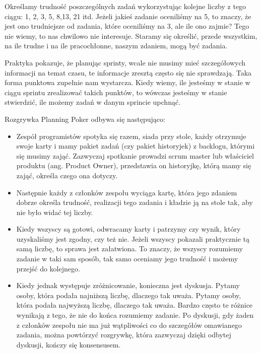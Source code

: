 Określamy trudność poszczególnych zadań wykorzystując kolejne liczby z tego ciągu: 1, 2, 3, 5, 8,13, 21 itd.
Jeżeli jakieś zadanie oceniliśmy na 5, to znaczy, że jest ono trudniejsze od zadania, które oceniliśmy na 3,
ale ile ono zajmie? Tego nie wiemy, to nas chwilowo nie interesuje.
Staramy się określić, przede wszystkim, na ile trudne i na ile pracochłonne, naszym zdaniem, mogą być zadania.

Praktyka pokazuje, że planując sprinty, wcale nie musimy mieć szczegółowych informacji na temat czasu,
te informacje zresztą często się nie sprawdzają.
Taka forma punktowa zupełnie nam wystarcza. Kiedy wiemy, ile jesteśmy w stanie w ciągu sprintu
zrealizować takich punktów, to wówczas jesteśmy w stanie stwierdzić, ile możemy zadań w danym sprincie upchnąć.

Rozgrywka Planning Poker odbywa się następująco:

\begin{itemize}
	\item Zespół programistów spotyka się razem, siada przy stole,
	każdy otrzymuje swoje karty i mamy pakiet zadań (czy pakiet historyjek) z backlogu,
	którymi się musimy zająć.
	Zazwyczaj spotkanie prowadzi scrum master lub właściciel produktu (ang. Product Owner),
	przedstawia on historyjkę, którą mamy się zająć, określa czego ona dotyczy.
	\item Następnie każdy z członków zespołu wyciąga kartę, która jego zdaniem dobrze określa trudność,
	realizacji tego zadania i kładzie ją na stole tak, aby nie było widać tej liczby.
	\item Kiedy wszyscy są gotowi, odwracamy karty i patrzymy czy wynik, który uzyskaliśmy jest zgodny,
	czy też nie. Jeżeli wszyscy pokazali praktycznie tą samą liczbę, to sprawa jest załatwiona.
	To znaczy, że wszyscy rozumiemy zadanie w taki sam sposób, tak samo oceniamy jego trudność
	i możemy przejść do kolejnego.
	\item Kiedy jednak występuje zróżnicowanie, konieczna jest dyskusja.
	Pytamy osoby, która podała najniższą liczbę, dlaczego tak uważa.
	Pytamy osoby, która podała najwyższą liczbę, dlaczego tak uważa.
	Bardzo często te różnice wynikają z tego, że nie do końca rozumiemy zadanie.
	Po dyskusji, gdy żaden z członków zespołu nie ma już wątpliwości co do
	szczegółów omawianego zadania, można powtórzyć rozgrywkę, która zazwyczaj dzięki
	odbytej dyskusji, kończy się konsensusem.
\end{itemize}

